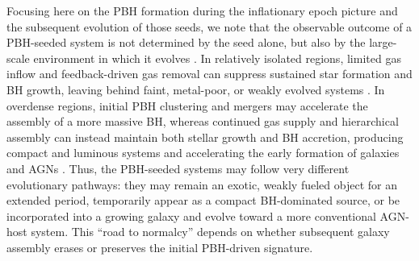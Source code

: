 \documentclass[twocolumn,trackchanges]{aastex701}
\begin{document}

Focusing here on the PBH formation during the inflationary epoch picture and the subsequent evolution of those seeds, we note that the observable outcome of a PBH-seeded system is not determined by the seed alone, but also by the large-scale environment in which it evolves \citep[see e.g.,][]{Carr2018MNRAS.478.3756C,Wang2026arXiv260315736W}. 
In relatively isolated regions, limited gas inflow and feedback-driven gas removal can suppress sustained star formation and BH growth, leaving behind faint, metal-poor, or weakly evolved systems \citep[e.g.,][]{Dayal2024A&A...690A.182D,Zhang2026PBHApJL,Dayal2026arXiv260420966D}. 
In overdense regions, initial PBH clustering and mergers may accelerate the assembly of a more massive BH, whereas continued gas supply and hierarchical assembly can instead maintain both stellar growth and BH accretion, producing compact and luminous systems and accelerating the early formation of galaxies and AGNs \citep{Liu2022ApJL, DeLuca2023PhRvL.130q1401D, Matteri2025PBH,Liu2025}. Thus, the PBH-seeded systems may follow very different evolutionary pathways: they may remain an exotic, weakly fueled object for an extended period, temporarily appear as a compact BH-dominated source, or be incorporated into a growing galaxy and evolve toward a more conventional AGN-host system. This ``road to normalcy'' depends on whether subsequent galaxy assembly erases or preserves the initial PBH-driven signature.
\end{document}
